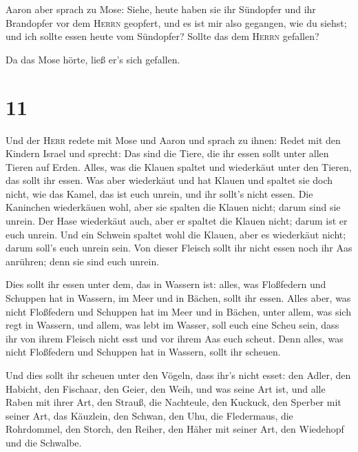  Aaron aber sprach zu Mose: Siehe, heute haben sie ihr
Sündopfer und ihr Brandopfer vor dem \textsc{Herrn} geopfert, und es ist
mir also gegangen, wie du siehst; und ich sollte essen heute vom
Sündopfer? Sollte das dem \textsc{Herrn} gefallen?

 Da das Mose hörte, ließ er's sich gefallen.

\hypertarget{section-10}{%
\section{11}\label{section-10}}

 Und der \textsc{Herr} redete mit Mose und Aaron und
sprach zu ihnen:  Redet mit den Kindern Israel und
sprecht: Das sind die Tiere, die ihr essen sollt unter allen Tieren auf
Erden.  Alles, was die Klauen spaltet und wiederkäut unter
den Tieren, das sollt ihr essen.  Was aber wiederkäut und
hat Klauen und spaltet sie doch nicht, wie das Kamel, das ist euch
unrein, und ihr sollt's nicht essen.  Die Kaninchen
wiederkäuen wohl, aber sie spalten die Klauen nicht; darum sind sie
unrein.  Der Hase wiederkäut auch, aber er spaltet die
Klauen nicht; darum ist er euch unrein.  Und ein Schwein
spaltet wohl die Klauen, aber es wiederkäut nicht; darum soll's euch
unrein sein.  Von dieser Fleisch sollt ihr nicht essen
noch ihr Aas anrühren; denn sie sind euch unrein.

 Dies sollt ihr essen unter dem, das in Wassern ist:
alles, was Floßfedern und Schuppen hat in Wassern, im Meer und in
Bächen, sollt ihr essen.  Alles aber, was nicht
Floßfedern und Schuppen hat im Meer und in Bächen, unter allem, was sich
regt in Wassern, und allem, was lebt im Wasser, soll euch eine Scheu
sein,  dass ihr von ihrem Fleisch nicht esst und vor
ihrem Aas euch scheut.  Denn alles, was nicht Floßfedern
und Schuppen hat in Wassern, sollt ihr scheuen.

 Und dies sollt ihr scheuen unter den Vögeln, dass ihr's
nicht esset: den Adler, den Habicht, den Fischaar,  den
Geier, den Weih, und was seine Art ist,  und alle Raben
mit ihrer Art,  den Strauß, die Nachteule, den Kuckuck,
den Sperber mit seiner Art,  das Käuzlein, den Schwan,
den Uhu,  die Fledermaus, die Rohrdommel, 
den Storch, den Reiher, den Häher mit seiner Art, den Wiedehopf und die
Schwalbe.

